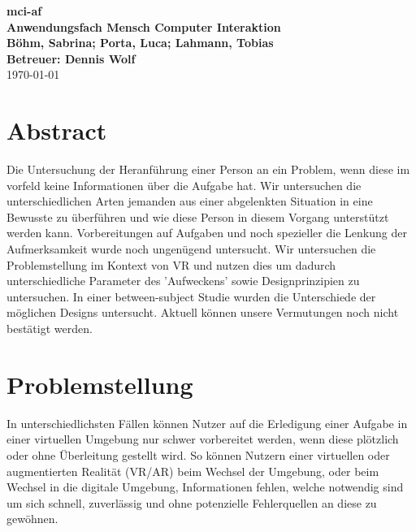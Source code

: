 \documentclass[a4paper, 11pt]{article}
\newcommand{\projectName}{mci-af}
\begin{document}
\begin{center}
	\textbf{\LARGE{\projectName}}\\
    \textbf{\large{Anwendungsfach Mensch Computer Interaktion}}\\
	\vspace{7mm}
    \textbf{\large{Böhm, Sabrina; Porta, Luca; Lahmann, Tobias}}\\
	\textbf{\large{Betreuer: Dennis Wolf}}\\
	\today
\end{center}

\section*{Abstract}
Die Untersuchung der Heranführung einer Person an ein Problem, wenn diese im vorfeld keine Informationen über die Aufgabe hat. %
Wir untersuchen die unterschiedlichen Arten jemanden aus einer abgelenkten Situation in eine Bewusste zu überführen und wie diese Person in diesem Vorgang unterstützt werden kann. %
Vorbereitungen auf Aufgaben und noch spezieller die Lenkung der Aufmerksamkeit wurde noch ungenügend untersucht. %
Wir untersuchen die Problemstellung im Kontext von VR und nutzen dies um dadurch unterschiedliche Parameter des 'Aufweckens' sowie Designprinzipien zu untersuchen. %
In einer between-subject Studie wurden die Unterschiede der möglichen Designs untersucht. %
Aktuell können unsere Vermutungen noch nicht bestätigt werden. %

\section*{Problemstellung}
In unterschiedlichsten Fällen können Nutzer auf die Erledigung einer Aufgabe in einer virtuellen Umgebung nur schwer vorbereitet werden, wenn diese  plötzlich oder ohne Überleitung gestellt wird. So können Nutzern einer virtuellen oder augmentierten Realität (VR/AR) beim Wechsel der Umgebung, oder beim Wechsel in die digitale Umgebung, Informationen fehlen, welche notwendig sind um sich schnell, zuverlässig und ohne potenzielle Fehlerquellen an diese zu gewöhnen. 
\end{document}

